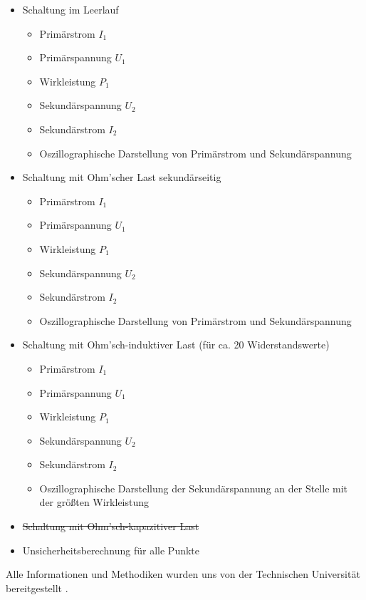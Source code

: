 \documentclass[12pt,a4paper,twoside]{article}
\begin{document}
\begin{itemize}
    \item Schaltung im Leerlauf
    \begin{itemize}
        \item Primärstrom $I_{1}$
        \item Primärspannung $U_{1}$
        \item Wirkleistung $P_{1}$
        \item Sekundärspannung $U_{2}$
        \item Sekundärstrom $I_{2}$
        \item Oszillographische Darstellung von Primärstrom und Sekundärspannung
    \end{itemize}
    \item Schaltung mit Ohm'scher Last sekundärseitig
    \begin{itemize}
        \item Primärstrom $I_{1}$
        \item Primärspannung $U_{1}$
        \item Wirkleistung $P_{1}$
        \item Sekundärspannung $U_{2}$
        \item Sekundärstrom $I_{2}$
        \item Oszillographische Darstellung von Primärstrom und Sekundärspannung
    \end{itemize}
    \item Schaltung mit Ohm'sch-induktiver Last (für ca. 20 Widerstandswerte)
    \begin{itemize}
        \item Primärstrom $I_{1}$
        \item Primärspannung $U_{1}$
        \item Wirkleistung $P_{1}$
        \item Sekundärspannung $U_{2}$
        \item Sekundärstrom $I_{2}$
        \item Oszillographische Darstellung der Sekundärspannung an der Stelle mit der größten Wirkleistung
    \end{itemize}
    \item \sout{Schaltung mit Ohm'sch-kapazitiver Last}
    \item Unsicherheitsberechnung für alle Punkte
\end{itemize}

\noindent
Alle Informationen und Methodiken wurden uns von der Technischen Universität bereitgestellt \cite{teachcenter2}. 
\end{document}
